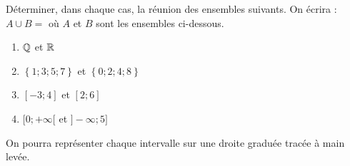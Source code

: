 
Déterminer, dans chaque cas, la réunion des ensembles suivants. On écrira : $A \cup B = $ où $A$ et $B$ sont les ensembles ci-dessous.
\begin{enumerate}
\item $\mathbb Q$ et $\mathbb R$
\item $\left\lbrace 1;3;5;7  \right\rbrace $ et $\left\lbrace 0;2;4;8  \right\rbrace $
\item $[-3;4]$ et $[2;6]$
\item $[0;+\infty[$ et $]-\infty;5]$
\end{enumerate}
On pourra représenter chaque intervalle sur une droite graduée tracée à main levée.